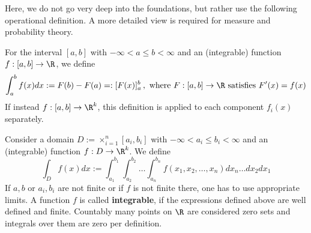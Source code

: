 Here, we do not go very deep into the foundations, but rather use the following operational definition. A more detailed view is required for measure and probability theory.
\label{def-integral} ~\\[-0.7cm]
\ite
\item[(1D)] For the interval $[a,b]$ with $-\infty< a\le b<\infty$ and an (integrable) function $f:[a,b]\to\R$, we define
\[
\int_a^bf(x)dx:=F(b)-F(a)=:[F(x)]_a^b\, , \text{ where } F:[a,b]\to\R \text{ satisfies } F'(x)=f(x) 
\]
If instead $f:[a,b]\to\R^k$, this definition is applied to each component $f_i(x)$ separately.
\item[(nD)] Consider a domain $D:=\mathop{\times}_{i=1}^n[a_i,b_i]$  with $-\infty< a_i\le b_i<\infty$ and an (integrable) function $f:D\to\R^k$. We define
\[
\int_D f(x)dx:=\int_{a_1}^{b_1}\int_{a_2}^{b_2}\ldots\int_{a_n}^{b_n}
f(x_1,x_2,\ldots,x_n)dx_n\ldots dx_2dx_1
\]
\eti
If $a,b$ or $a_i,b_i$ are not finite or if $f$ is not finite there, one has to use appropriate limits. A function $f$ is called \textbf{integrable}, if the expressions defined above are well defined and finite. Countably many points on $\R$ are considered zero sets and integrals over them are zero per definition.
\newpage 
